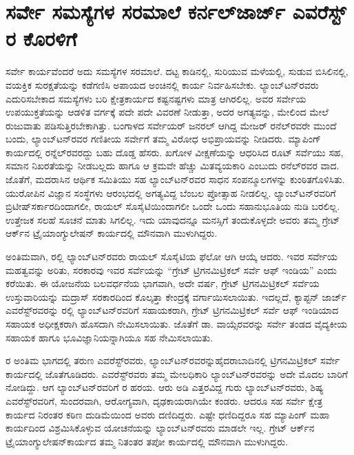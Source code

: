 
\chapter{ಸರ್ವೇ ಸಮಸ್ಯೆಗಳ ಸರಮಾಲೆ ಕರ್ನಲ್​ ಜಾರ್ಜ್ ಎವರೆಸ್ಟ್​ರ ಕೊರಳಿಗೆ}

\vskip -9pt

ಸರ್ವೇ ಕಾರ್ಯವೆಂದರೆ ಅದು ಸಮಸ್ಯೆಗಳ ಸರಮಾಲೆ. ದಟ್ಟ ಕಾಡಿನಲ್ಲಿ, ಸುರಿಯುವ ಮಳೆಯಲ್ಲಿ, ಸುಡುವ ಬಿಸಿಲಿನಲ್ಲಿ, ವಯಕ್ತಿಕ ಸುರಕ್ಷತೆಯನ್ನು ಕಡೆಗಣಿಸಿ ಅಪಾಯದ ಅಂಚಿನಲ್ಲಿ ಕಾರ್ಯ ನಿರ್ವಹಿಸಬೇಕು. ಲ್ಯಾಂಬ್​ಟನ್​ರವರು ಎದುರಿಸಬೇಕಾದ ಸಮಸ್ಯೆಗಳು ಬರಿ ಕ್ಷೇತ್ರಕಾರ್ಯದ ಕಷ್ಟನಷ್ಟಗಳು ಮಾತ್ರ ಆಗಿರಲಿಲ್ಲ. ಅವರ ಸರ್ವೇಯ ಉಪಯುಕ್ತತೆಯನ್ನು ಆಡಳಿತ ವರ್ಗಕ್ಕೆ ಪದೇ ಪದೇ ವಿವರಣೆ ನೀಡುತ್ತಾ, ಅದರ ಅಗತ್ಯವನ್ನು, ಮೇಲಿಂದ ಮೇಲೆ ರುಜುವಾತು ಪಡಿಸುತ್ತಿರಬೇಕಾಗಿತ್ತು. ಬಂಗಾಳದ ಸರ್ವೇಯರ್​ ಜನರಲ್​ ಆಗಿದ್ದ ಮೇಜರ್​ ರನೆಲ್​ರವರೇ ಮುಂದೆ ಬಂದು, ಲ್ಯಾಂಬ್​ಟನ್​ರವರ ಗಣಿತೀಯ ಸರ್ವೇಗೆ ತಮ್ಮ ವಿರೋಧ ಅಭಿಪ್ರಾಯವನ್ನು ನೀಡಿದರು. ಮ್ಯಾಪಿಂಗ್​ ಕಾರ್ಯದಲ್ಲಿ ರನ್ನೆಲ್​ರವರದ್ದು ಬಹು ದೊಡ್ಡ ಹೆಸರು. ಖಗೋಳ ವೀಕ್ಷಣೆಯನ್ನು ಆಧರಿಸಿದ ರೂಟ್​ ಸರ್ವೆಯು ಸಹ, ಸಮಾನ ನಿಖರತೆಯನ್ನು ನೀಡಬಲ್ಲದು ಹಾಗೂ ಆ ಕ್ರಮವೇ ಹೆಚ್ಚು ಮಿತವ್ಯಯಕಾರಿ ಎಂಬುದು ರನೆಲ್​ರವರ ವಾದ. ಜೊತೆಗೆ, ಮದರಾಸಿನ ಆರ್ಥಿಕ ಸಮಿತಿಯು ಸಹ ಲ್ಯಾಂಬ್​ಟನ್​ರವರ ಸಾಧನ ಸಂಪನ್ಮೂಲಗಳನ್ನು ಕುಂಠಿತಗೊಳಿಸಿತು. ಯುರೋಪಿನ ವಿಜ್ಞಾನ ಸಂಸ್ಥೆಗಳು ಆರಂಭದಲ್ಲಿ ಅಗತ್ಯವಿದ್ದ ಬೆಂಬಲ ಪ್ರೋತ್ಸಾಹ ನೀಡಲಿಲ್ಲ. ಲ್ಯಾಂಬ್​ಟನ್​ರವರಿಗೆ ಬ್ರಿಟೀಷ್​ ಸರ್ಕಾರದಿಂದಾಗಲೀ, ರಾಯಲ್​ ಸೊಸೈಟಿಯಿಂದಾಗಲೀ ಒಂದೇ ಒಂದು ಸಹಾನುಭೂತಿಯ ನುಡಿ ಬರಲಿಲ್ಲ. ಉತ್ತೇಜಕ ಸಲಹೆ ಸೂಚನೆ ಮಾತು ಸಿಗಲಿಲ್ಲ. ಇದು ಯಾವುದನ್ನೂ ಮನಸ್ಸಿಗೆ ತಂದುಕೊಳ್ಳದೇ ಅವರು ತಮ್ಮ ಗ್ರೇಟ್​ ಆರ್ಕ್‌ನ ಟ್ರೈಯಾಂಗ್ಯುಲೇಷನ್​ ಕಾರ್ಯದಲ್ಲಿ ಮೌನವಾಗಿ ಮುಳುಗಿದ್ದರು.

ಅಂತಿಮವಾಗಿ, ರಲ್ಲಿ ಲ್ಯಾಂಬ್​ಟನ್​ರವರು ರಾಯಲ್​ ಸೊಸೈಟಿಯ ಫೆಲೋ ಆಗಿ ಆಯ್ಕೆ ಆದರು. ಇವರ ಸರ್ವೇಯ ಮಹತ್ವವನ್ನು ಅರಿತು, ಸರಕಾರವು ಇವರ ಸರ್ವೆಯನ್ನು “ಗ್ರೇಟ್​ ಟ್ರಿಗನಮಿಟ್ರಿಕಲ್​ ಸರ್ವೆ ಆಫ್​ ಇಂಡಿಯ” ಎಂದು ಕರೆಯಿತು. ಈ ಯೋಜನೆಯ ಬಲವರ್ಧನೆಯ ಭಾಗವಾಗಿ, ಅದೇ ವರ್ಷ, ಗ್ರೇಟ್​ ಟ್ರಿಗನಮಿಟ್ರಿಕಲ್​ ಸರ್ವೆಯ ಉಸ್ತುವಾರಿಯನ್ನು ಮದ್ರಾಸ್​ ಸರಕಾರದಿಂದ ಕೊಲ್ಕತ್ತಾ ಕೇಂದ್ರಕ್ಕೆ ವರ್ಗಾಯಿಸಲಾಯಿತು. ಇದಲ್ಲದೆ, ಕ್ಯಾಪ್ಟನ್​ ಜಾರ್ಜ್ ಎವರೆಸ್ಟ್​ರವರನ್ನು  ರಲ್ಲಿ ಲ್ಯಾಂಬ್​ಟನ್​ರವರಿಗೆ ಸಹಾಯಕರಾಗಿ, ಗ್ರೇಟ್​ ಟ್ರಿಗನಮಿಟ್ರಿಕಲ್​ ಸರ್ವೆ ಆಫ್​ ಇಂಡಿಯಾದ ಸಹಾಯಕ ಅಧೀಕ್ಷಕರಾಗಿ ಹೊಸದಾಗಿ ನೇಮಿಸಲಾಯಿತು. ಜೊತೆಗೆ ಡಾ. ವಾಯ್ಸೆರವರನ್ನು ಸರ್ವೇ ತಂಡದ ವೈದ್ಯಕೀಯ ಸಹಾಯಕ ಹಾಗೂ ಭೂವಿಜ್ಞಾನಿಯನ್ನಾಗಿಯೂ ಸಹ ನೇಮಿಸಲಾಯಿತು.

ರ ಅಂತಿಮ ಭಾಗದಲ್ಲಿ ತರುಣ ಎವರೆಸ್ಟ್​ರವರು, ಲ್ಯಾಂಬ್​ಟನ್​ರವರನ್ನು\break ಹೈದರಾಬಾದಿನಲ್ಲಿ ಟ್ರಿಗನಮಿಟ್ರಿಕಲ್​ ಸರ್ವೇ ಕಾರ್ಯದಲ್ಲಿ ಜೊತೆಗೂಡಿದರು. ಎವರೆಸ್ಟ್​\break ರವರು ತಮ್ಮ ಮೇಲಧಿಕಾರಿ ಲ್ಯಾಂಬ್​ಟನ್​ರವರನ್ನು ಅದೇ ಮೊದಲ ಬಾರಿಗೆ ನೋಡಿದ್ದು. ಆಗ ಲ್ಯಾಂಬ್​ಟನ್​ರವರಿಗೆ ರ ಹರಯ. ಆರು ಅಡಿ ಎತ್ತರವಿದ್ದ ಗುರು ಲ್ಯಾಂಬ್​ಟನ್​\break ರವರು, ಶಿಷ್ಯ ಎವರೆಸ್ಟ್​ರವರಿಗೆ, ಸುಂದರವಾಗಿ, ಆರೋಗ್ಯವಾಗಿ, ದೃಢಕಾಯರಾಗಿಯೇ ಕಂಡರು. ಆದರೂ ಸಹ ಸರ್ವೇ ಕ್ಷೇತ್ರ ಕಾರ್ಯದ ನಿರಂತರ ಕಠಿಣ ದುಡಿಮೆಯಿಂದ ಅವರು ದಣಿದಿದ್ದರು. ಎಷ್ಟೇ ಧಣಿದಿದ್ದರೂ ಸಹ ಮ್ಯಾಪಿಂಗ್​ ಮಹಾ ಕಾರ್ಯದಿಂದ ವಿಶ್ರಮಿಸಿಕೊಳ್ಳುವ ಯೋಚನೆಯನ್ನು ಲ್ಯಾಂಬ್​ಟನ್​ರವರು ಮಾಡಲೇ ಇಲ್ಲ. ಗ್ರೇಟ್​ ಆರ್ಕ್‌ನ ಟ್ರೈಯಾಂಗ್ಯುಲೇಷನ್​ ಕಾರ್ಯದ ತಮ್ಮ ನಿತಂತರ ತಪೋ ಕಾರ್ಯದಲ್ಲಿ ಮೌನವಾಗಿ ಮುಳುಗಿದ್ದರು.

